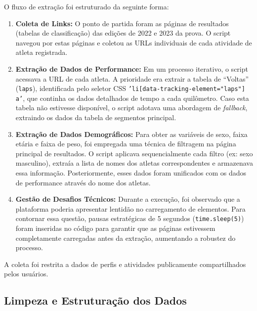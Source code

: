 O fluxo de extração foi estruturado da seguinte forma:
\begin{enumerate}
    \item \textbf{Coleta de Links:} O ponto de partida foram as páginas de resultados (tabelas de classificação) das edições de 2022 e 2023 da prova. O script navegou por estas páginas e coletou as URLs individuais de cada atividade de atleta registrada.
    
    \item \textbf{Extração de Dados de Performance:} Em um processo iterativo, o script acessava a URL de cada atleta. A prioridade era extrair a tabela de ``Voltas'' (\texttt{laps}), identificada pelo seletor CSS \texttt{'li[data-tracking-element="laps"] a'}, que continha os dados detalhados de tempo a cada quilômetro. Caso esta tabela não estivesse disponível, o script adotava uma abordagem de \emph{fallback}, extraindo os dados da tabela de segmentos principal.
    
    \item \textbf{Extração de Dados Demográficos:} Para obter as variáveis de sexo, faixa etária e faixa de peso, foi empregada uma técnica de filtragem na página principal de resultados. O script aplicava sequencialmente cada filtro (ex: sexo masculino), extraía a lista de nomes dos atletas correspondentes e armazenava essa informação. Posteriormente, esses dados foram unificados com os dados de performance através do nome dos atletas.
    
    \item \textbf{Gestão de Desafios Técnicos:} Durante a execução, foi observado que a plataforma poderia apresentar lentidão no carregamento de elementos. Para contornar essa questão, pausas estratégicas de 5 segundos (\texttt{time.sleep(5)}) foram inseridas no código para garantir que as páginas estivessem completamente carregadas antes da extração, aumentando a robustez do processo.
\end{enumerate}
A coleta foi restrita a dados de perfis e atividades publicamente compartilhados pelos usuários.

\subsection{Limpeza e Estruturação dos Dados}
\label{subsec:limpeza}

